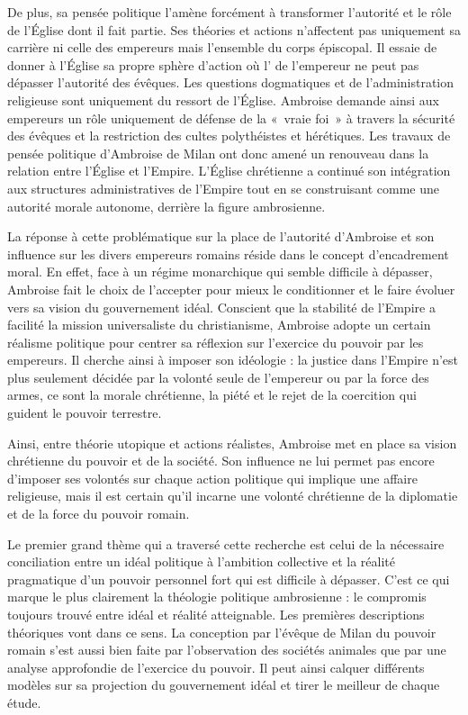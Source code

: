 \bigskip

De plus, sa pensée politique l'amène forcément à transformer l'autorité et le rôle de l'Église dont il fait partie. Ses théories et actions n'affectent pas uniquement sa carrière ni celle des empereurs mais l'ensemble du corps épiscopal. Il essaie de donner à l'Église sa propre sphère d'action où l' de l'empereur ne peut pas dépasser l'autorité des évêques. Les questions dogmatiques et de l'administration religieuse sont uniquement du ressort de l'Église. Ambroise demande ainsi aux empereurs un rôle uniquement de défense de la «~vraie foi~» à travers la sécurité des évêques et la restriction des cultes polythéistes et hérétiques. Les travaux de pensée politique d'Ambroise de Milan ont donc amené un renouveau dans la relation entre l'Église et l'Empire. L'Église chrétienne a continué son intégration aux structures administratives de l'Empire tout en se construisant comme une autorité morale autonome, derrière la figure ambrosienne.

\bigskip

La réponse à cette problématique sur la place de l'autorité d'Ambroise et son influence sur les divers empereurs romains réside dans le concept d'encadrement moral. En effet, face à un régime monarchique qui semble difficile à dépasser, Ambroise fait le choix de l'accepter pour mieux le conditionner et le faire évoluer vers sa vision du gouvernement idéal. Conscient que la stabilité de l'Empire a facilité la mission universaliste du christianisme, Ambroise adopte un certain réalisme politique pour centrer sa réflexion sur l'exercice du pouvoir par les empereurs. Il cherche ainsi à imposer son idéologie : la justice dans l'Empire n'est plus seulement décidée par la volonté seule de l'empereur ou par la force des armes, ce sont la morale chrétienne, la piété et le rejet de la coercition qui guident le pouvoir terrestre.

\bigskip

Ainsi, entre théorie utopique et actions réalistes, Ambroise met en place sa vision chrétienne du pouvoir et de la société. Son influence ne lui permet pas encore d'imposer ses volontés sur chaque action politique qui implique une affaire religieuse, mais il est certain qu'il incarne une volonté chrétienne de la diplomatie et de la force du pouvoir romain.

\bigskip

Le premier grand thème qui a traversé cette recherche est celui de la nécessaire conciliation entre un idéal politique à l'ambition collective et la réalité pragmatique d'un pouvoir personnel fort qui est difficile à dépasser. C'est ce qui marque le plus clairement la théologie politique ambrosienne : le compromis toujours trouvé entre idéal et réalité atteignable. Les premières descriptions théoriques vont dans ce sens. La conception par l'évêque de Milan du pouvoir romain s'est aussi bien faite par l'observation des sociétés animales que par une analyse approfondie de l'exercice du pouvoir. Il peut ainsi calquer différents modèles sur sa projection du gouvernement idéal et tirer le meilleur de chaque étude.

